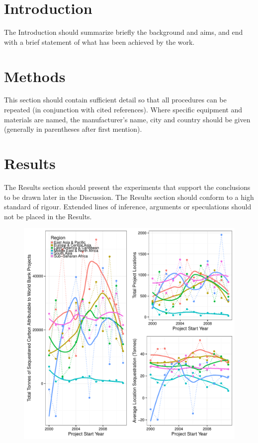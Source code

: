 \documentclass{article}\usepackage[]{graphicx}\usepackage[]{color}
\makeatletter
\def\maxwidth{ %
  \ifdim\Gin@nat@width>\linewidth
    \linewidth
  \else
    \Gin@nat@width
  \fi
}
\newenvironment{knitrout}{}{}  %
\makeatother
\begin{document}
\begin{knitrout}
\newpage
\section{Introduction}



The Introduction should summarize briefly the background and aims, and end with a brief statement of what has been achieved by the work.

\section{Methods}
This section should contain sufficient detail so that all procedures can be repeated (in conjunction with cited references). Where specific equipment and materials are named, the manufacturer’s name, city and country should be given (generally in parentheses after first mention).

\section{Results}
The Results section should present the experiments that support the conclusions to be drawn later in the Discussion. The Results section should conform to a high standard of rigour. Extended lines of inference, arguments or speculations should not be placed in the Results.

\begin{figure}\centering
\begin{Schunk}

\includegraphics[width=\maxwidth]{figure/Fig1-1} \end{Schunk}
\end{figure}  


\end{knitrout}
\end{document}
